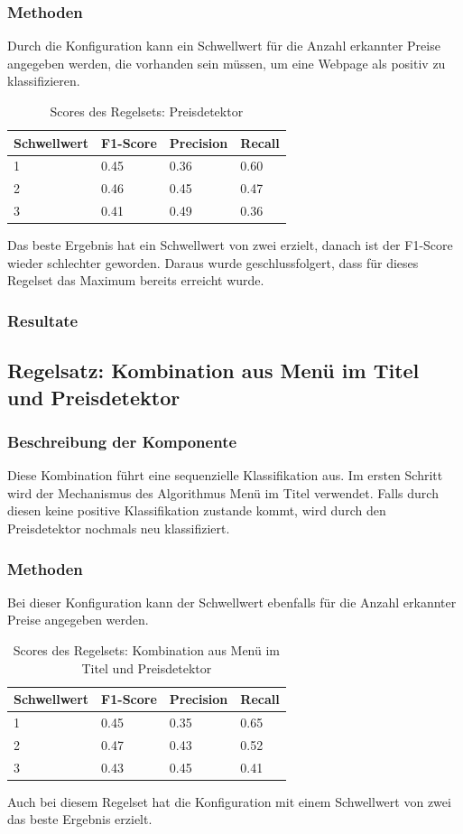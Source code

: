\subsubsection{Methoden}
Durch die Konfiguration kann ein Schwellwert für die Anzahl erkannter Preise angegeben werden, die vorhanden sein müssen, um eine Webpage als positiv zu klassifizieren.\\
\begin{table}[H]
	\caption{Scores des Regelsets: Preisdetektor}
	\centering
	\begin{tabular}{|l|l|l|l|}
		\hline
		Schwellwert & F1-Score & Precision & Recall\\
		\hline
		1 & 0.45 & 0.36 & 0.60  \\
		2 & 0.46 & 0.45 & 0.47 \\
		3 & 0.41 & 0.49 & 0.36 \\
		\hline
	\end{tabular}
\end{table}
Das beste Ergebnis hat ein Schwellwert von zwei erzielt, danach ist der F1-Score wieder schlechter geworden.
Daraus wurde geschlussfolgert, dass für dieses Regelset das Maximum bereits erreicht wurde.
\subsubsection{Resultate}
\subsection{Regelsatz: Kombination aus Menü im Titel und Preisdetektor}
\subsubsection{Beschreibung der Komponente}
Diese Kombination führt eine sequenzielle Klassifikation aus.
Im ersten Schritt wird der Mechanismus des Algorithmus \glqq Menü im Titel\grqq{} verwendet.
Falls durch diesen keine positive Klassifikation zustande kommt, wird durch den Preisdetektor nochmals neu klassifiziert.
\subsubsection{Methoden}
Bei dieser Konfiguration kann der Schwellwert ebenfalls für die Anzahl erkannter Preise angegeben werden.\\
\begin{table}[H]
	\caption{Scores des Regelsets: Kombination aus Menü im Titel und Preisdetektor}
	\centering
	\begin{tabular}{|l|l|l|l|}
		\hline
		Schwellwert & F1-Score & Precision & Recall\\
		\hline
		1 & 0.45 & 0.35 & 0.65 \\
		2 & 0.47 & 0.43 & 0.52 \\
		3 & 0.43 & 0.45 & 0.41 \\
		\hline
	\end{tabular}
\end{table}
Auch bei diesem Regelset hat die Konfiguration mit einem Schwellwert von zwei das beste Ergebnis erzielt.
